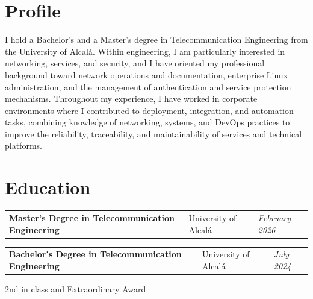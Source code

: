 \section{Profile}
\begin{onecolentry}
	I hold a Bachelor's and a Master's degree in Telecommunication Engineering from the University of Alcalá. Within engineering, I am particularly interested in networking, services, and security, and I have oriented my professional background toward network operations and documentation, enterprise Linux administration, and the management of authentication and service protection mechanisms. Throughout my experience, I have worked in corporate environments where I contributed to deployment, integration, and automation tasks, combining knowledge of networking, systems, and DevOps practices to improve the reliability, traceability, and maintainability of services and technical platforms.
\end{onecolentry}

\vspace{-5pt}

\section{Education}

\begin{onecolentry}
	\begin{tabularx}{\textwidth}{@{}>{\raggedright\arraybackslash}X>{\raggedright\arraybackslash}p{3.6cm}>{\raggedleft\arraybackslash}p{2.4cm}@{}}
		\textbf{Master's Degree in Telecommunication Engineering} & University of Alcalá & \textit{February 2026}
	\end{tabularx}

\end{onecolentry}

\vspace{0.2 cm}

\begin{onecolentry}
	\begin{tabularx}{\textwidth}{@{}>{\raggedright\arraybackslash}X>{\raggedright\arraybackslash}p{3.6cm}>{\raggedleft\arraybackslash}p{2.4cm}@{}}
		\textbf{Bachelor's Degree in Telecommunication Engineering} & University of Alcalá & \textit{July 2024}
	\end{tabularx}
	
	\vspace{0.05 cm}
	\hspace{0.2cm}2nd in class and Extraordinary Award
\end{onecolentry}


